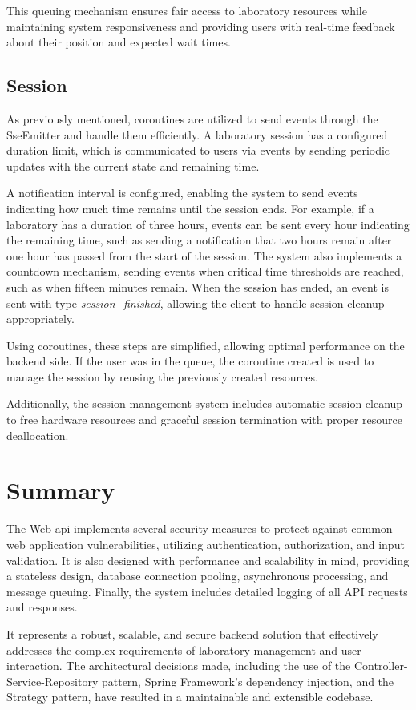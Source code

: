 This queuing mechanism ensures fair access to laboratory resources while maintaining system responsiveness and providing users with real-time feedback about their position and expected wait times.

\subsection{Session}
As previously mentioned, coroutines are utilized to send events through the SseEmitter and handle them efficiently. A laboratory session has a configured duration limit, which is communicated to users via events by sending periodic updates with the current state and remaining time.

A notification interval is configured, enabling the system to send events indicating how much time remains until the session ends. For example, if a laboratory has a duration of three hours, events can be sent every hour indicating the remaining time, such as sending a notification that two hours remain after one hour has passed from the start of the session. The system also implements a countdown mechanism, sending events when critical time thresholds are reached, such as when fifteen minutes remain. When the session has ended, an event is sent with type \textit{session\_finished}, allowing the client to handle session cleanup appropriately.

Using coroutines, these steps are simplified, allowing optimal performance on the backend side. If the user was in the queue, the coroutine created is used to manage the session by reusing the previously created resources.

Additionally, the session management system includes automatic session cleanup to free hardware resources and graceful session termination with proper resource deallocation.

\section{Summary}
The Web \acs{api} implements several security measures to protect against common web application vulnerabilities, utilizing authentication, authorization, and input validation. It is also designed with performance and scalability in mind, providing a stateless design, database connection pooling, asynchronous processing, and message queuing. Finally, the system includes detailed logging of all API requests and responses.

It represents a robust, scalable, and secure backend solution that effectively addresses the complex requirements of laboratory management and user interaction. The architectural decisions made, including the use of the Controller-Service-Repository pattern, Spring Framework's dependency injection, and the Strategy pattern, have resulted in a maintainable and extensible codebase.


